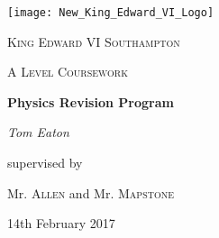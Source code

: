 \centering
\texttt{[image: New\_King\_Edward\_VI\_Logo]}\par\vspace{1cm}
{\scshape\LARGE King Edward VI Southampton\par}
\vspace{1cm}
{\scshape\Large A Level Coursework\par}
\vspace{1.5cm}
{\huge\bfseries Physics Revision Program\par}
\vspace{2cm}
{\Large\itshape Tom Eaton\par}
\vfill
supervised by\par
Mr. \textsc{Allen} and Mr. \textsc{Mapstone}

\vfill	
{\large 14th February 2017\par}
